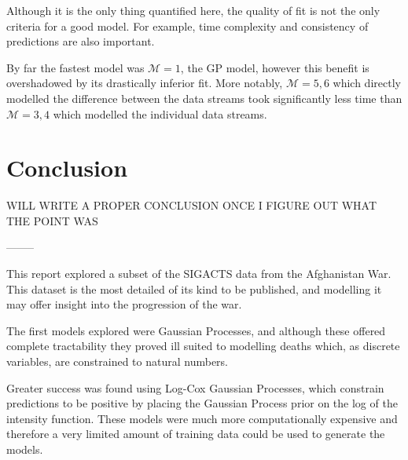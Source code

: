 \documentclass[a4paper,11pt]{report}
\begin{document}
Although it is the only thing quantified here, the quality of fit is not the only criteria for a good model. For example, time complexity and consistency of predictions are also important. \par 

By far the fastest model was \(\mathcal{M}=1\), the GP model, however this benefit is overshadowed by its drastically inferior fit. More notably, \(\mathcal{M}=5,6\) which directly modelled the difference between the data streams took significantly less time than \(\mathcal{M}=3,4\) which modelled the individual data streams. 


\chapter{Conclusion}

WILL WRITE A PROPER CONCLUSION ONCE I FIGURE OUT WHAT THE POINT WAS

--------

This report explored a subset of the SIGACTS data from the Afghanistan War. This dataset is the most detailed of its kind to be published, and modelling it may offer insight into the progression of the war. \par

The first models explored were Gaussian Processes, and although these offered complete tractability they proved ill suited to modelling deaths which, as discrete variables, are constrained to natural numbers. \par

Greater success was found using Log-Cox Gaussian Processes, which constrain predictions to be positive by placing the Gaussian Process prior on the log of the intensity function. These models were much more computationally expensive and therefore a very limited amount of training data could be used to generate the models. \par









\singlespacing 

\newpage



\end{document}
